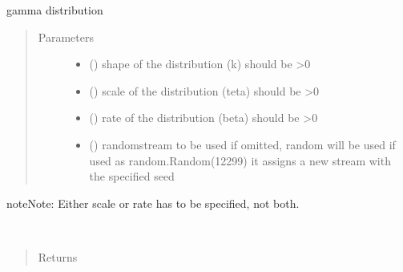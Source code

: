\documentclass[letterpaper,10pt,english]{sphinxmanual}
\begin{document}

\begin{fulllineitems}
\label{\detokenize{Reference:salabim.Gamma}}
gamma distribution
\begin{quote}\begin{description}
\item[{Parameters}] \leavevmode\begin{itemize}
\item {} 
 () \textendash{} shape of the distribution (k) 
should be \textgreater{}0

\item {} 
 () \textendash{} scale of the distribution (teta) 
should be \textgreater{}0

\item {} 
 () \textendash{} rate of the distribution (beta) 
should be \textgreater{}0

\item {} 
 () \textendash{} randomstream to be used 
if omitted, random will be used 
if used as random.Random(12299)
it assigns a new stream with the specified seed

\end{itemize}

\end{description}\end{quote}

\begin{sphinxadmonition}{note}{Note:}
Either scale or rate has to be specified, not both.
\end{sphinxadmonition}

\begin{fulllineitems}
\label{\detokenize{Reference:salabim.Gamma.mean}}~\begin{quote}\begin{description}
\item[{Returns}] \leavevmode
{}


\end{description}
\end{quote}
\end{fulllineitems}
\end{fulllineitems}
\end{document}
